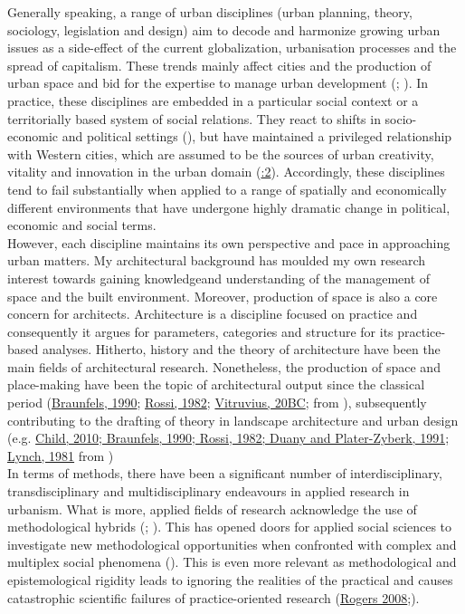 \documentclass[11pt]{report}
\begin{document}
Generally speaking, a range of urban disciplines (urban planning, theory, sociology, legislation and design) aim to decode and harmonize growing urban issues as a side-effect of the current globalization, urbanisation processes and the spread of capitalism. These trends mainly affect cities and the production of urban space and bid for the expertise to manage urban development (\href{ref}{\citealt{allmendinger_planning_2009}}; \href{ref}{\citealt{faludi_planning_1973}}).
In practice, these disciplines are embedded in a particular social context or a territorially based system of social relations. They react to shifts in socio-economic and political settings  (\href{ref}{\citealt{tsenkova_beyond_2006}}), but have maintained a privileged relationship with Western cities, which are assumed to be the sources of urban creativity, vitality and innovation in the urban domain (\href{ref}{\citealt{robinson_ordinary_2006}:2}). Accordingly, these disciplines tend to fail substantially when applied to a range of spatially and economically different environments that have undergone highly dramatic change in political, economic and social terms. 
\\

However, each discipline maintains its own perspective and pace in approaching urban matters. My architectural background has moulded my own research interest towards gaining knowledgeand understanding of the management of space and the built environment. Moreover, production of space is also a core concern for architects. Architecture is a discipline focused on practice and consequently it argues for parameters, categories and structure for its practice-based analyses.  
Hitherto, history and the theory of architecture have been the main fields of architectural research. 
Nonetheless, the production of space and place-making have been the topic of architectural output since the classical period  (\href{ref}{Braunfels, 1990}; \href{ref}{Rossi, 1982}; \href{ref}{Vitruvius, 20BC}; from \href{van}{\citealt{van_assche_co-evolutions_2013}}), subsequently contributing to the drafting of theory in landscape architecture and urban design (e.g. \href{ref}{Child, 2010; Braunfels, 1990; Rossi, 1982; Duany and Plater-Zyberk, 1991; Lynch, 1981} from \citealt{van_assche_co-evolutions_2013})
\\

In terms of methods, there have been a significant number of interdisciplinary, transdisciplinary and multidisciplinary endeavours in applied research in urbanism. What is more, applied fields of research acknowledge the use of methodological hybrids (\href{ref}{\citealt{datta_paradigm_1994}}; \href{ref}{\citealt{de_lisle_benefits_2011}}). This has opened doors for applied social sciences to investigate new methodological opportunities when confronted with complex and multiplex social phenomena (\href{ref}{\citealt{de_lisle_benefits_2011}}). This is even more relevant as methodological and epistemological rigidity leads to ignoring the realities of the practical and causes catastrophic scientific failures of practice-oriented research (\href{ref}{Rogers 2008};\href{ref}{\citealt{lisle_benefits_2011}}).
\\
\end{document}
